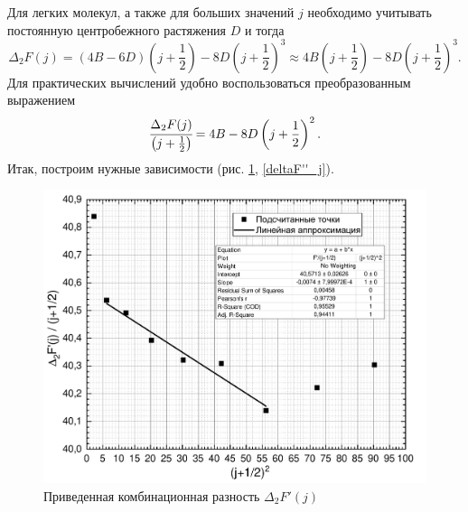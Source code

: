 Для легких молекул, а также для больших значений $j$ необходимо учитывать постоянную центробежного растяжения $D$ и тогда
\begin{equation}
\Delta_2F(j)=(4B-6D)\left(j+\frac{1}{2}\right)-8D\left(j+\frac{1}{2}\right)^3\approx4B\left(j+\frac{1}{2}\right)-8D\left(j+\frac{1}{2}\right)^3.
\end{equation}
Для практических вычислений удобно воспользоваться преобразованным выражением 
\begin{equation}
\cfrac{\Delta_2F(j)}{\left(j+\frac{1}{2}\right)}=4B-8D\left(j+\frac{1}{2}\right)^2.
\end{equation}
Итак, построим нужные зависимости (рис. \ref{deltaF'_j}, \ref{deltaF''_j}).
\begin{figure}[H]
	\vspace{-0.8cm}
	\centering
	\includegraphics[height=0.49\textheight]{data/delta_F'_j_sq}
	\vspace{-0.2cm}
	\caption{Приведенная комбинационная разность $\Delta_2F'(j)$}
	\label{deltaF'_j}
\end{figure}
